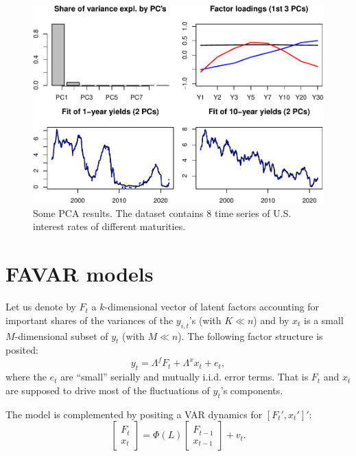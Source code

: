 \documentclass[
  12pt,
]{book}
\theoremstyle{definition}
\theoremstyle{definition}
\theoremstyle{definition}
\theoremstyle{definition}
\theoremstyle{remark}
\begin{document}
\begin{figure}
\includegraphics{IdentifStructShocks_files/figure-latex/USydsPCA1-1} \caption{Some PCA results. The dataset contains 8 time series of U.S. interest rates of different maturities.}\label{fig:USydsPCA1}
\end{figure}

\hypertarget{favar-models}{%
\section{FAVAR models}\label{favar-models}}

Let us denote by \(F_t\) a \(k\)-dimensional vector of latent factors accounting for important shares of the variances of the \(y_{i,t}\)'s (with \(K \ll n\)) and by \(x_t\) is a small \(M\)-dimensional subset of \(y_t\) (with \(M \ll n\)). The following factor structure is posited:
\[
y_t = \Lambda^f F_t + \Lambda^x x_t + e_t,
\]
where the \(e_t\) are ``small'' serially and mutually i.i.d. error terms. That is \(F_t\) and \(x_t\) are supposed to drive most of the fluctuations of \(y_t\)'s components.

The model is complemented by positing a VAR dynamics for \([F_t',x_t']'\):
\begin{equation}
\left[\begin{array}{c}F_t\\x_t\end{array}\right] = \Phi(L)\left[\begin{array}{c}F_{t-1}\\ x_{t-1}\end{array}\right] + v_t.\label{eq:FAVAR}
\end{equation}
\end{document}
